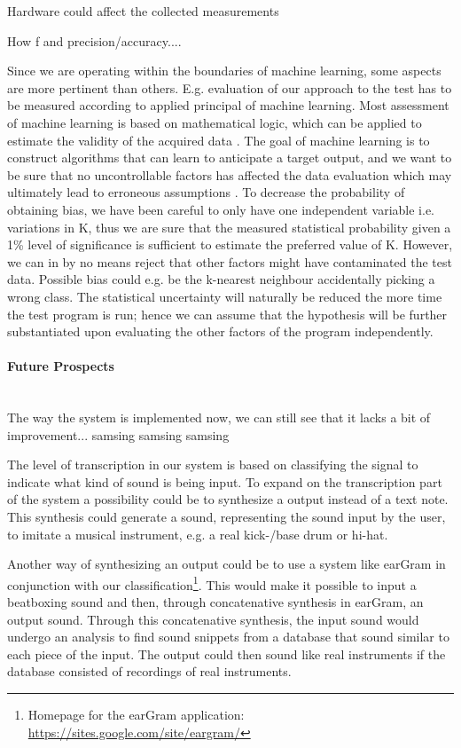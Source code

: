 Hardware could affect the collected measurements

How f and precision/accuracy....
 


Since we are operating within the boundaries of machine learning, some aspects are more pertinent than others. E.g. evaluation of our approach to the test has to be measured according to applied principal of machine learning. Most assessment of machine learning is based on mathematical logic, which can be applied to estimate the validity of the acquired data \citep{Gordon1995}. The goal of machine learning is to construct algorithms that can learn to anticipate a target output, and we want to be sure that no uncontrollable factors has affected the data evaluation which may ultimately lead to erroneous assumptions \citep{Gordon1995}. To decrease the probability of obtaining bias, we have been careful to only have one independent variable i.e. variations in K, thus we are sure that the measured statistical probability given a 1\% level of significance is sufficient to estimate the preferred value of K. However, we can in by no means reject that other factors might have contaminated the test data. Possible bias could e.g. be the k-nearest neighbour accidentally picking a wrong class. The statistical uncertainty will naturally be reduced the more time the test program is run; hence we can assume that the hypothesis will be further substantiated upon evaluating the other factors of the program independently.\\
\paragraph{Future Prospects} \hspace{0pt} \\
The way the system is implemented now, we can still see that it lacks a bit of improvement... samsing samsing samsing

The level of transcription in our system is based on classifying the signal to indicate what kind of sound is being input. To expand on the transcription part of the system a possibility could be to synthesize a output instead of a text note. This synthesis could generate a sound, representing the sound input by the user, to imitate a musical instrument, e.g. a real kick-/base drum or hi-hat.

Another way of synthesizing an output could be to use a system like earGram in conjunction with our classification\footnote{Homepage for the earGram application: \url{https://sites.google.com/site/eargram/}}. This would make it possible to input a beatboxing sound and then, through concatenative synthesis in earGram, an output sound. Through this concatenative synthesis, the input sound would undergo an analysis to find sound snippets from a database that sound similar to each piece of the input. The output could then sound like real instruments if the database consisted of recordings of real instruments.

